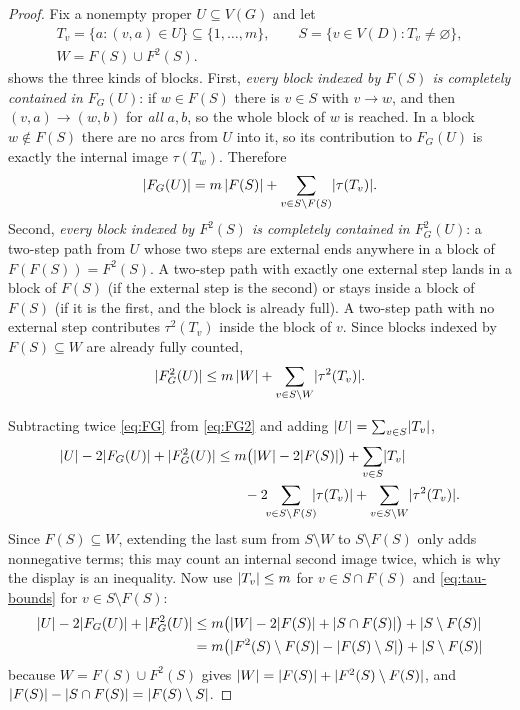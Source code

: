 \begin{proof}
Fix a nonempty proper $U\subseteq V(G)$ and let
\begin{equation}\label{eq:support}
 \begin{gathered}
  T_v=\{a:(v,a)\in U\}\subseteq\{1,\dots,m\},\qquad
  S=\{v\in V(D):T_v\ne\varnothing\},\\
  W=F(S)\cup F^2(S).
 \end{gathered}
\end{equation}
 shows the three kinds of blocks. First, \emph{every block indexed by $F(S)$ is
completely contained in $F_G(U)$}: if $w\in F(S)$ there is $v\in S$ with $v\to w$, and then
$(v,a)\to(w,b)$ for \emph{all} $a,b$, so the whole block of $w$ is reached. In a block $w\notin
F(S)$ there are no arcs from $U$ into it, so its contribution to $F_G(U)$ is exactly the internal
image $\tau(T_w)$. Therefore
\begin{equation}\label{eq:FG}
 \lvert F_G(U)\rvert=m\,\lvert F(S)\rvert+\sum_{v\in S\setminus F(S)}\lvert \tau(T_v)\rvert .
\end{equation}
Second, \emph{every block indexed by $F^2(S)$ is completely contained in $F_G^2(U)$}: a two-step
path from $U$ whose two steps are external ends anywhere in a block of $F(F(S))=F^2(S)$. A
two-step path with exactly one external step lands in a block of $F(S)$ (if the external step is
the second) or stays inside a block of $F(S)$ (if it is the first, and the block is already full).
A two-step path with no external step contributes $\tau^2(T_v)$ inside the block of $v$. Since
blocks indexed by $F(S)\subseteq W$ are already fully counted,
\begin{equation}\label{eq:FG2}
 \lvert F_G^2(U)\rvert\le m\,\lvert W\rvert+\sum_{v\in S\setminus W}\lvert \tau^2(T_v)\rvert .
\end{equation}

Subtracting twice \eqref{eq:FG} from \eqref{eq:FG2} and adding $\lvert U\rvert=\sum_{v\in S}\lvert T_v\rvert$,
\begin{align}
 \lvert U\rvert-2\lvert F_G(U)\rvert+\lvert F_G^2(U)\rvert
 &\le m\bigl(\lvert W\rvert-2\lvert F(S)\rvert\bigr)+\sum_{v\in S}\lvert T_v\rvert\notag\\
 &\qquad{}-2\!\!\sum_{v\in S\setminus F(S)}\!\!\lvert \tau(T_v)\rvert
       +\sum_{v\in S\setminus W}\lvert \tau^2(T_v)\rvert .\label{eq:blowup-sharp}
\end{align}
Since $F(S)\subseteq W$, extending the last sum from $S\setminus W$ to $S\setminus F(S)$ only adds
nonnegative terms; this may count an internal second image twice, which is why the display is an
inequality. Now use $\lvert T_v\rvert\le m$ for $v\in S\cap F(S)$ and \eqref{eq:tau-bounds} for
$v\in S\setminus F(S)$:
\begin{align}
 \lvert U\rvert-2\lvert F_G(U)\rvert+\lvert F_G^2(U)\rvert
 &\le m\bigl(\lvert W\rvert-2\lvert F(S)\rvert+\lvert S\cap F(S)\rvert\bigr)+\lvert S\setminus F(S)\rvert\notag\\
 &=m\bigl(\lvert F^2(S)\setminus F(S)\rvert-\lvert F(S)\setminus S\rvert\bigr)+\lvert S\setminus F(S)\rvert
 \label{eq:blowup-main}
\end{align}
because $W=F(S)\cup F^2(S)$ gives $\lvert W\rvert=\lvert F(S)\rvert+\lvert F^2(S)\setminus F(S)\rvert$, and
$\lvert F(S)\rvert-\lvert S\cap F(S)\rvert=\lvert F(S)\setminus S\rvert$.


\end{proof}
